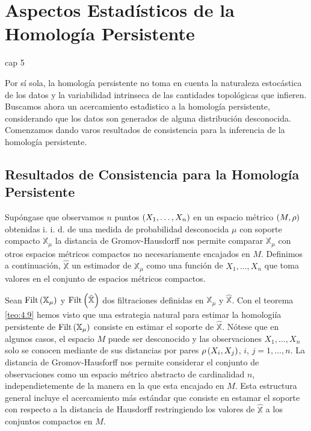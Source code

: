 \chapter{Aspectos Estad\'isticos de la Homolog\'ia Persistente}\label{chap:Cap5}cap 5

Por s\'i sola, la homolog\'ia persistente no toma en cuenta la naturaleza estoc\'astica de los datos
y la variabilidad intrinseca de las cantidades topol\'ogicas que infieren.
Buscamos ahora un acercamiento esta\'distico a la homolog\'ia persistente,
considerando que los datos son generados de alguna distribuci\'on desconocida.
Comenzamos dando varos resultados de consistencia para la inferencia de la homolog\'ia persistente.

\section{Resultados de Consistencia para la Homolog\'ia Persistente}

Sup\'ongase que observamos $n$ puntos $\left(X_{1},\dots,X_{n}\right)$ en un espacio m\'etrico
$\left(M,\rho\right)$ obtenidas i. i. d. de una medida de probabilidad desconocida $\mu$ con
soporte compacto $\mathbb{X}_{\mu}$ la distancia de Gromov-Hausdorff nos permite comparar
$\mathbb{X}_{\mu}$ con otros espacios m\'etricos compactos no necesariamente encajados en $M$.
Definimos a continuaci\'on, $\hat{\mathbb{X}}$ un estimador de $\mathbb{X}_{\mu}$
como una funci\'on de $X_{1},\dots,X_{n}$ que toma valores en el conjunto de espacios m\'etricos compactos.

Sean $\mathrm{Filt}\left(\mathbb{X}_{\mu}\right)$ y $\mathrm{Filt}\left(\hat{\mathbb{X}}\right)$
dos filtraciones definidas en $\mathbb{X}_{\mu}$ y $\hat{\mathbb{X}}$.
Con el teorema \ref{teo:4.9} hemos visto que una estrategia natural
para estimar la homologi\'ia persistente de $\mathrm{Filt}\left(\mathbb{X}_{\mu}\right)$
consiste en estimar el soporte de $\hat{\mathbb{X}}$.
N\'otese que en algunos casos, el espacio $M$ puede ser desconocido
y las observaciones $X_{1},\dots,X_{n}$ solo se conocen mediante de sus distancias por pares
$\rho\left(X_{i}, X_{j}\right)$, $i$, $j = 1,\dots,n$.
La distancia de Gromov-Hausforff nos permite considerar el conjunto de observaciones
como un espacio m\'etrico abstracto de cardinalidad $n$,
independietemente de la manera en la que esta encajado en $M$.
Esta estructura general incluye el acercamiento m\'as est\'andar
que consiste en estamar el soporte con respecto a la distancia de Hausdorff
restringiendo los valores de $\hat{\mathbb{X}}$ a los conjuntos compactos en $M$.

